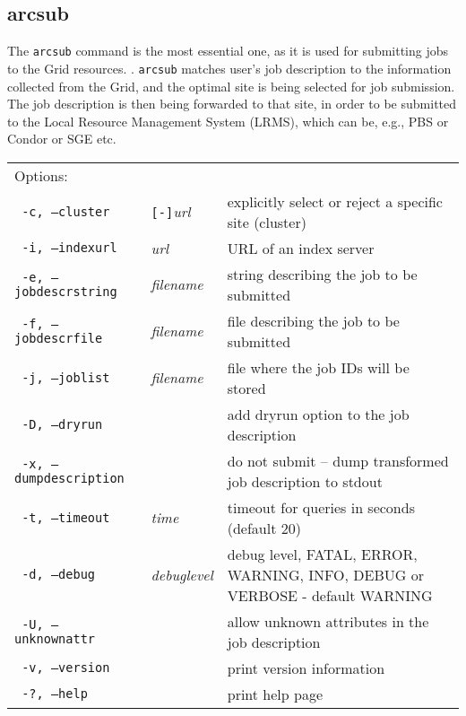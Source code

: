 \subsection{arcsub}\label{sec:arcsub}
The \texttt{arcsub} command is the
most essential one, as it is used for submitting jobs to the Grid
resources. . \texttt{arcsub} matches user's job
description to the information collected from the Grid, and the
optimal site is being selected for job submission. The job description
is then being forwarded to that site, in order to be submitted to the
Local Resource Management System (LRMS), which can be, e.g., PBS or
Condor or SGE etc.

\hspace*{0.5cm}
\begin{shaded}
\end{shaded}
\begin{longtable}{llp{8cm}}
   Options:&&\\
   \texttt{ -c, --cluster}&\verb#[-]#\textit{url}&explicitly select or reject a specific site (cluster)\\
   \texttt{ -i, --indexurl}&\textit{url}&URL of an index server\\
   \texttt{ -e, --jobdescrstring}&\textit{filename}&string describing the job to be submitted\\
   \texttt{ -f, --jobdescrfile}&\textit{filename}&file describing the job to be submitted\\
   \texttt{ -j, --joblist}&\textit{filename}&file where the job IDs will be stored\\
   \texttt{ -D, --dryrun}&&add dryrun option to the job description\\
   \texttt{ -x, --dumpdescription}&&do not submit -- dump transformed job description to stdout\\
   \texttt{ -t, --timeout}&\textit{time}&timeout for queries in seconds (default 20)\\
   \texttt{ -d, --debug}&\textit{debuglevel}&debug level, FATAL, ERROR, WARNING, INFO, DEBUG or VERBOSE - default WARNING\\
   \texttt{ -U, --unknownattr}&&allow unknown attributes in the job description\\
   \texttt{ -v, --version}&&print version information\\
   \texttt{ -?, --help}&&print help page\\
\end{longtable}



